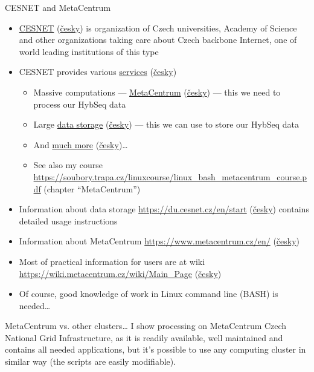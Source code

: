 \documentclass[compress, ucs, xelatex, 11pt, xcolor=x11names, aspectratio=169,
	hyperref={
		bookmarks=true,
		unicode=true,
		colorlinks=true,
		pdftitle={HybSeq course},
		plainpages=false,
		pdfauthor={Vojtech Zeisek},
		pdfsubject={Practical processing of HybSeq target enrichment sequencing data on computing grids like MetaCentrum},
		pdfcreator={XeLaTeX},
		pdfkeywords={BASH, command line, GNU, HybSeq, Linux, MetaCentrum, sequencing shell, target enrichment},
		linkcolor=Turquoise4, %
		anchorcolor=DodgerBlue4, %
		citecolor=DodgerBlue4, %
		filecolor=DodgerBlue4, %
		menucolor=Tan4, %
		urlcolor=DarkOliveGreen4, %
		pdftex},
	url={hyphens, lowtilde} %
	]{beamer}
\renewcommand{\alert}[1]{\textcolor{OrangeRed3}{#1}}
\begin{document}
\begin{frame}[allowframebreaks]{CESNET and MetaCentrum}
	\label{CESNET}
	\begin{itemize}
		\item \href{https://www.cesnet.cz/?lang=en}{CESNET} (\href{https://www.cesnet.cz/}{česky}) is organization of Czech universities, Academy of Science and other organizations taking care about Czech backbone Internet, one of world leading institutions of this type
		\item CESNET provides various \href{https://www.cesnet.cz/services/?lang=en}{services} (\href{https://www.cesnet.cz/sluzby/}{česky})
		\begin{itemize}
			\item Massive computations --- \href{https://www.cesnet.cz/services/massive-computations-metacentrum/?lang=en}{MetaCentrum} (\href{https://www.cesnet.cz/sluzby/metacentrum/}{česky}) --- \alert{this we need to process our HybSeq data}
			\item Large \href{https://www.cesnet.cz/services/data-storage/?lang=en}{data storage} (\href{https://www.cesnet.cz/sluzby/datova-uloziste/}{česky}) --- \alert{this we can use to store our HybSeq data}
			\item And \href{https://www.cesnet.cz/services/?lang=en}{much more} (\href{https://www.cesnet.cz/sluzby/}{česky})\ldots
			\item See also my course \url{https://soubory.trapa.cz/linuxcourse/linux_bash_metacentrum_course.pdf} (chapter \enquote{MetaCentrum})
		\end{itemize}
		\item Information about data storage \url{https://du.cesnet.cz/en/start} (\href{https://du.cesnet.cz/cs/start}{česky}) contains detailed usage instructions
		\item Information about MetaCentrum \url{https://www.metacentrum.cz/en/} (\href{https://www.metacentrum.cz/cs/}{česky})
		\item Most of practical information for users are at wiki \url{https://wiki.metacentrum.cz/wiki/Main_Page} (\href{https://wiki.metacentrum.cz/wiki/Hlavn\%C3\%AD_strana}{česky})
		\item Of course, good knowledge of work in Linux command line (BASH) is needed\ldots
	\end{itemize}
	\vfill
	\begin{alertblock}{MetaCentrum vs. other clusters\ldots}
		I show processing on MetaCentrum Czech National Grid Infrastructure, as it is readily available, well maintained and contains all needed applications, but it's possible to use any computing cluster in similar way (the scripts are easily modifiable).
	\end{alertblock}
	\vfill
\end{frame}
\end{document}
